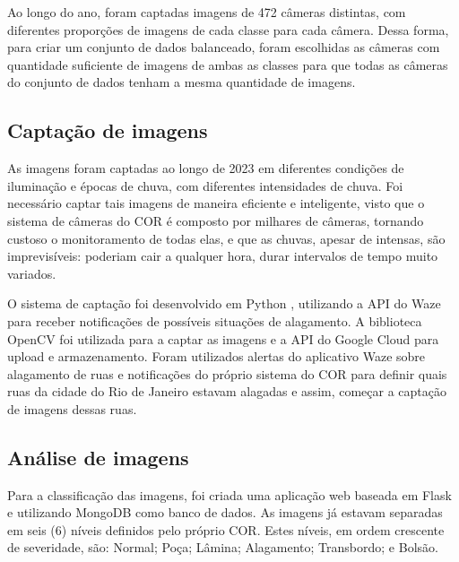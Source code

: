Ao longo do ano, foram captadas imagens de 472 câmeras distintas, com diferentes proporções de imagens de cada classe para cada câmera. 
Dessa forma, para criar um conjunto de dados balanceado, 
foram escolhidas as câmeras com quantidade suficiente de imagens de ambas as classes para que todas as câmeras do conjunto de dados tenham a mesma quantidade de imagens.

\subsection{Captação de imagens}


As imagens foram captadas ao longo de 2023 em diferentes condições de iluminação e épocas de chuva, com diferentes intensidades de chuva. 
Foi necessário captar tais imagens de maneira eficiente e inteligente, visto que o sistema de câmeras do COR é composto por milhares de câmeras, 
tornando custoso o monitoramento de todas elas, e que as chuvas, apesar de intensas, são imprevisíveis: poderiam cair a qualquer hora, durar intervalos de tempo muito variados.

O sistema de captação foi desenvolvido em Python \cite{van1995python}, utilizando a API do Waze para receber notificações de possíveis situações de alagamento. A biblioteca OpenCV \cite{itseez2015opencv} foi utilizada para a captar as imagens e a API do Google Cloud para upload e armazenamento.
Foram utilizados alertas do aplicativo Waze sobre alagamento de ruas e notificações do próprio sistema do COR para definir quais ruas da cidade do Rio de Janeiro estavam alagadas e assim, começar a captação de imagens dessas ruas. 


\subsection{Análise de imagens}
Para a classificação das imagens, foi criada uma aplicação web baseada em Flask e utilizando MongoDB como banco de dados. 
As imagens já estavam separadas em seis (6) níveis definidos pelo próprio COR. Estes níveis, em ordem crescente de severidade, são: Normal; Poça; Lâmina; Alagamento; Transbordo; e Bolsão. 

